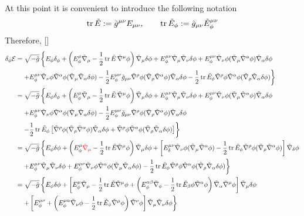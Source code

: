 At this point it is convenient to introduce the following notation
\begin{equation}
  \tr \tilde{E}:=\tilde{g}^{\mu\nu }E_{\mu\nu },\qquad \tr\tilde{E}_\phi :=\tilde{g}_{\mu\nu }\tilde{E}^{\mu\nu }_\phi 
\end{equation}
Therefore, []
\begin{align*}
   \delta_\phi\mathcal{E} &=\sqrt{-\tilde{g}}\left\{E_\phi\delta_\phi+\left(E^\mu_\phi\tilde{\nabla}_\mu-\frac{1}{2}\tr\tilde{E }\, \tilde{\nabla}^\mu\phi \right)\tilde{\nabla}_\mu\delta\phi +E^{\mu\nu }_\phi \tilde{\nabla}_\mu\tilde{\nabla}_\nu \delta\phi +E^{\mu\nu }_\phi\tilde{\nabla}_\nu \phi(\tilde{\nabla}_\mu \tilde{\nabla}^\alpha\phi )\tilde{\nabla}_\alpha\delta\phi \right.\\
  &\left.\quad + E^{\mu\nu }_\phi\tilde{\nabla}_\nu\phi\tilde{\nabla}^\alpha \phi(\tilde{\nabla}_\mu\tilde{\nabla}_\alpha\delta\phi )-\frac{1}{2}E^{\mu\nu}_\phi \tilde{g}_{\mu\nu }\tilde{\nabla}^\rho\phi(\tilde{\nabla}_\rho\tilde{\nabla}^\alpha \phi )\tilde{\nabla}_\alpha\delta\phi  -\frac{1}{2}\tr \tilde{E}_\phi \tilde{\nabla}^\rho\phi\tilde{\nabla}^\alpha\phi(\tilde{\nabla}_\rho\tilde{\nabla}_\alpha\delta\phi )\right\}\\
  &=\sqrt{-\tilde{g}}\left\{E_\phi\delta_\phi+\left(E^\mu_\phi\tilde{\nabla}_\mu-\frac{1}{2}\tr\tilde{E }\, \tilde{\nabla}^\mu\phi \right)\tilde{\nabla}_\mu\delta\phi +E^{\mu\nu }_\phi \tilde{\nabla}_\mu\tilde{\nabla}_\nu \delta\phi +E^{\mu\nu }_\phi\tilde{\nabla}_\nu \phi(\tilde{\nabla}_\mu \tilde{\nabla}^\alpha\phi )\tilde{\nabla}_\alpha\delta\phi \right.\\
  &\left.\quad + E^{\mu\nu }_\phi\tilde{\nabla}_\nu\phi\tilde{\nabla}^\alpha \phi(\tilde{\nabla}_\mu\tilde{\nabla}_\alpha\delta\phi )-\frac{1}{2}E^{\mu\nu}_\phi \tilde{g}_{\mu\nu }\tilde{\nabla}^\rho\phi(\tilde{\nabla}_\rho\tilde{\nabla}^\alpha \phi )\tilde{\nabla}_\alpha\delta\phi \right.\\
   &\left.\quad  -\frac{1}{2}\tr\tilde{E}_\phi \left[\tilde{\nabla}^\rho\phi (\tilde{\nabla}_\rho\tilde{\nabla}^\alpha\phi )\tilde{\nabla}_\alpha\delta\phi +\tilde{\nabla}^\rho\phi\tilde{\nabla}^\alpha\phi (\tilde{\nabla}_\rho\tilde{\nabla}_\alpha\delta\phi )\right]\right\}\\
   &=\sqrt{-\tilde{g}}\left\{E_\phi\delta\phi +\left(E^\mu_\phi\textcolor{red}{\tilde{\nabla}_\mu}-\frac{1}{2}\tr \tilde{E}\tilde{\nabla}^\mu\phi \right)\tilde{\nabla}_\mu\delta\phi +\left[E^{\mu\nu }_\delta\tilde{\nabla}_\nu\phi (\tilde{\nabla}_\mu\tilde{\nabla}^\alpha\phi )-\frac{1}{2}\tr \tilde{E}_\phi \tilde{\nabla}^\rho\phi (\tilde{\nabla}_\rho\tilde{\nabla}^\alpha\phi )\right]\tilde{\nabla}_\delta\phi\right. \\
   &\left. \quad +E^{\mu\nu }_\phi\tilde{\nabla}_\mu\tilde{\nabla}_\nu \delta\phi +E^{\mu\nu }_\phi\tilde{\nabla}_\nu\phi\tilde{\nabla}^\alpha\phi (\tilde{\nabla}_\mu\tilde{\nabla}_\alpha\delta\phi )-\frac{1}{2}\tr \tilde{E}_\phi \tilde{\nabla}^\rho\phi\tilde{\nabla}^\alpha\phi (\tilde{\nabla}_\rho\tilde{\nabla}_\alpha\delta\phi )\right\}\\
    &=\sqrt{-\tilde{g}}\left\{E_\phi\delta\phi +\left[E^\mu_\phi \tilde{\nabla}_\mu-\frac{1}{2}\tr\tilde{E}\tilde{\nabla}^\mu\phi +\left(E^{\alpha\beta }_\phi\tilde{\nabla}_\phi-\frac{1}{2}\tr \tilde{E}_\beta\phi \tilde{\nabla}^\alpha\phi \right)\tilde{\nabla}_\alpha\tilde{\nabla}^\mu\phi \right]\tilde{\nabla}_\mu\delta\phi\right.\\
    &\quad \left.+\left[E^{\mu\nu }_\phi+\left(E^{\mu\alpha }_\phi \tilde{\nabla}_\nu\phi-\frac{1}{2}\tr\tilde{E}_\phi \tilde{\nabla}^\mu\phi \right)\tilde{\nabla}^\nu\phi \right]\tilde{\nabla}_\mu\tilde{\nabla}_\nu\delta\phi  \right\}
\end{align*}

